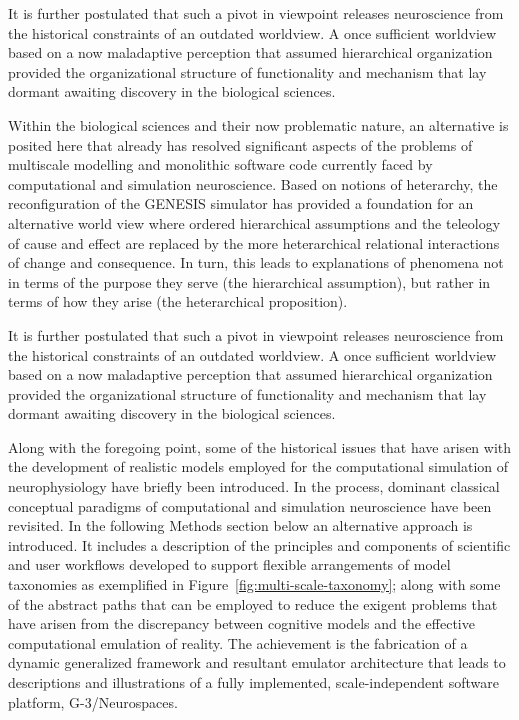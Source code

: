 \documentclass[11pt,3p,twocolumn]{JMN}
\begin{document}
It is further postulated that such a pivot in viewpoint releases neuroscience from the historical constraints of an outdated worldview. A once sufficient worldview based on a now maladaptive perception that assumed hierarchical organization provided the organizational structure of functionality and mechanism that lay dormant awaiting discovery in the biological sciences.

Within the biological sciences and their now problematic nature, an alternative is posited here that already has resolved significant aspects of the problems of multiscale modelling and monolithic software code currently faced by computational and simulation neuroscience. Based on notions of heterarchy, the reconfiguration of the GENESIS simulator has provided a foundation for an alternative world view where ordered hierarchical assumptions and the teleology of cause and effect are replaced by the more heterarchical relational interactions of change and consequence. In turn, this leads to explanations of phenomena not in terms of the purpose they serve (the hierarchical assumption), but rather in terms of how they arise (the heterarchical proposition).

It is further postulated that such a pivot in viewpoint releases neuroscience from the historical constraints of an outdated worldview. A once sufficient worldview based on a now maladaptive perception that assumed hierarchical organization provided the organizational structure of functionality and mechanism that lay dormant awaiting discovery in the biological sciences.

Along with the foregoing point, some of the historical issues that have arisen with the development of realistic models employed for the computational simulation of neurophysiology have briefly been introduced. In the process, dominant classical conceptual paradigms of computational and simulation neuroscience have been revisited. In the following Methods section below an alternative approach is introduced. It includes a description of the principles and components of scientific and user workflows developed to support flexible arrangements of model taxonomies as exemplified in Figure~\ref{fig:multi-scale-taxonomy}; along with some of the abstract paths that can be employed to reduce the exigent problems that have arisen from the discrepancy between cognitive models and the effective computational emulation of reality. The achievement is the fabrication of a dynamic generalized framework and resultant emulator architecture that leads to descriptions and illustrations of a fully implemented, scale-independent software platform, G-3/Neurospaces.
\end{document}
